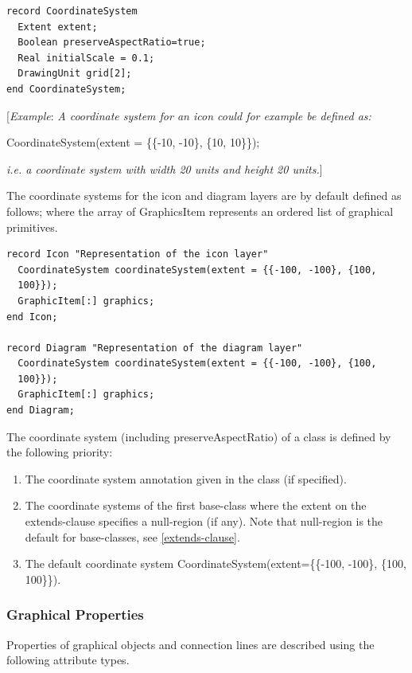 \documentclass[10pt,a4paper]{report}
\def\doublelabel#1{\label{#1}\hypertarget{#1}{}}
\renewcommand{\labelenumi}{\arabic{enumi}.}
\begin{document}
\begin{lstlisting}[language=modelica]
record CoordinateSystem
  Extent extent;
  Boolean preserveAspectRatio=true;
  Real initialScale = 0.1;
  DrawingUnit grid[2];
end CoordinateSystem;
\end{lstlisting}
{[}\emph{Example}: \emph{A coordinate system for an icon could for
example be defined as:}

CoordinateSystem(extent = \{\{-10, -10\}, \{10, 10\}\});

\emph{i.e. a coordinate system with width 20 units and height 20
units.}{]}

The coordinate systems for the icon and diagram layers are by default
defined as follows; where the array of GraphicsItem represents an
ordered list of graphical primitives.

\begin{lstlisting}[language=modelica]
record Icon "Representation of the icon layer"
  CoordinateSystem coordinateSystem(extent = {{-100, -100}, {100,
  100}});
  GraphicItem[:] graphics;
end Icon;

record Diagram "Representation of the diagram layer"
  CoordinateSystem coordinateSystem(extent = {{-100, -100}, {100,
  100}});
  GraphicItem[:] graphics;
end Diagram;
\end{lstlisting}
The coordinate system (including preserveAspectRatio) of a class is
defined by the following priority:

\begin{enumerate}
\def\labelenumi{\arabic{enumi}.}
\item
  The coordinate system annotation given in the class (if specified).
\item
  The coordinate systems of the first base-class where the extent on the
  extends-clause specifies a null-region (if any). Note that null-region
  is the default for base-classes, see \ref{extends-clause}.
\item
  The default coordinate system CoordinateSystem(extent=\{\{-100,
  -100\}, \{100, 100\}\}).
\end{enumerate}

\subsubsection{Graphical Properties}\doublelabel{graphical-properties}

Properties of graphical objects and connection lines are described using
the following attribute types.
\end{document}
